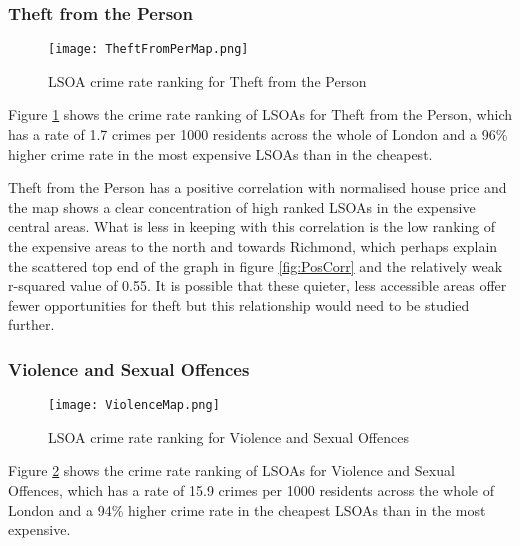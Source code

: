 \documentclass{article}
\begin{document}
\subsubsection{Theft from the Person}
\begin{figure}[H]
\begin{center}
  \texttt{[image: TheftFromPerMap.png]}
  \caption{LSOA crime rate ranking for Theft from the Person}
  \label{fig:TheftFromPerMap}
\end{center}
\end{figure}

Figure \ref{fig:TheftFromPerMap} shows the crime rate ranking of LSOAs for Theft from the Person, which has a rate of 1.7 crimes per 1000 residents across the whole of London and a 96\% higher crime rate in the most expensive LSOAs than in the cheapest.
\newline 

Theft from the Person has a positive correlation with normalised house price and the map shows a clear concentration of high ranked LSOAs in the expensive central areas. What is less in keeping with this correlation is the low ranking of the expensive areas to the north and towards Richmond, which perhaps explain the scattered top end of the graph in figure \ref{fig:PosCorr} and the relatively weak r-squared value of 0.55. It is possible that these quieter, less accessible areas offer fewer opportunities for theft but this relationship would need to be studied further.
\newline

\subsubsection{Violence and Sexual Offences}
\begin{figure}[H]
\begin{center}
  \texttt{[image: ViolenceMap.png]}
  \caption{LSOA crime rate ranking for Violence and Sexual Offences}
  \label{fig:ViolenceMap}
\end{center}
\end{figure}

Figure \ref{fig:ViolenceMap} shows the crime rate ranking of LSOAs for Violence and Sexual Offences, which has a rate of 15.9 crimes per 1000 residents across the whole of London and a 94\% higher crime rate in the cheapest LSOAs than in the most expensive.
\newline 
\end{document}
